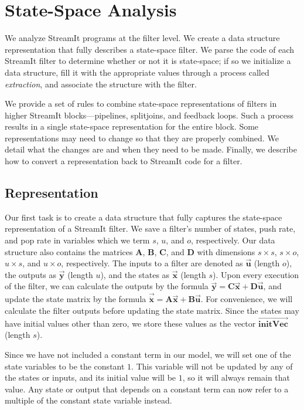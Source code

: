 \section{State-Space Analysis}

  We analyze StreamIt programs at the filter level. We create
a data structure representation that fully describes a state-space
filter. We parse the code of each StreamIt filter to determine
whether or not it is state-space; if so we initialize a data
structure, fill it with the appropriate values through a process
called \emph{extraction}, and associate the structure with the
filter.

    We provide a set of rules to combine state-space representations
of filters in higher StreamIt blocks---pipelines, splitjoins, and
feedback loops. Such a process results in a single state-space
representation for the entire block. Some representations may need
to change so that they are properly combined. We detail what the
changes are and when they need to be made. Finally, we describe
how to convert a representation back to StreamIt code for a
filter.

\subsection{Representation}

    Our first task is to create a data structure that fully captures
the state-space representation of a StreamIt filter.  We save a
filter's number of states, push rate, and pop rate in variables
which we term $s$, $u$, and $o$, respectively. Our data structure
also contains the matrices $\mathbf{A}$, $\mathbf{B}$,
$\mathbf{C}$, and $\mathbf{D}$ with dimensions $s \times s$, $s
\times o$, $u \times s$, and $u \times o$, respectively. The
inputs to a filter are denoted as $\vec{\mathbf{u}}$ (length $o$),
the outputs as $\vec{\mathbf{y}}$ (length $u$), and the states as
$\vec{\mathbf{x}}$ (length $s$). Upon every execution of the
filter, we can calculate the outputs by the formula
$\vec{\mathbf{y}} = \mathbf{C}\vec{\mathbf{x}} +
\mathbf{D}\vec{\mathbf{u}}$, and update the state matrix by the
formula $\vec{\dot{\mathbf{x}}} = \mathbf{A}\vec{\mathbf{x}} +
\mathbf{B}\vec{\mathbf{u}}$. For convenience, we will calculate
the filter outputs before updating the state matrix. Since the
states may have initial values other than zero, we store these
values as the vector $\overrightarrow{\mathbf{initVec}}$ (length
$s$).

    Since we have not included a constant term in our model, we
will set one of the state variables to be the constant $1$. This
variable will not be updated by any of the states or inputs, and
its initial value will be $1$, so it will always remain that
value. Any state or output that depends on a constant term can now
refer to a multiple of the constant state variable instead.

